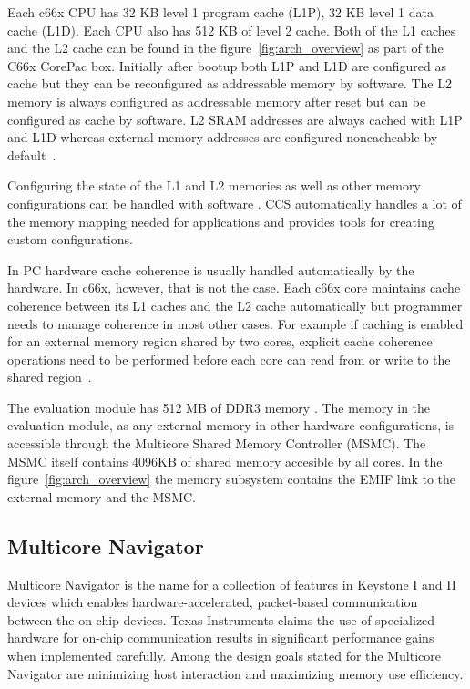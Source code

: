 Each c66x CPU has 32 KB level 1 program cache (L1P), 32 KB level 1 data cache (L1D). Each CPU also has 512 KB of level 2 cache. Both of the L1 caches and the L2 cache can be found in the figure~\ref{fig:arch_overview} as part of the C66x CorePac box. Initially after bootup both L1P and L1D are configured as cache but they can be reconfigured as addressable memory by software. The L2 memory is always configured as addressable memory after reset but can be configured as cache by software. \cite{tmsdatasheet} L2 SRAM addresses are always cached with L1P and L1D whereas external memory addresses are configured noncacheable by default~\cite{cacheguide}.

Configuring the state of the L1 and L2 memories as well as other memory configurations can be handled with software \cite{sprugh7}. CCS automatically handles a lot of the memory mapping needed for applications and provides tools for creating custom configurations.

In PC hardware cache coherence is usually handled automatically by the hardware. In c66x, however, that is not the case. Each c66x core maintains cache coherence between its L1 caches and the L2 cache automatically but programmer needs to manage coherence in most other cases. For example if caching is enabled for an external memory region shared by two cores, explicit cache coherence operations need to be performed before each core can read from or write to the shared region~\cite{cacheguide}.

The evaluation module has 512 MB of DDR3 memory \cite{evmref}. The memory in the evaluation module, as any external memory in other hardware configurations, is accessible through the Multicore Shared Memory Controller (MSMC). The MSMC itself contains 4096KB of shared memory accesible by all cores. In the figure~\ref{fig:arch_overview} the memory subsystem contains the EMIF link to the external memory and the MSMC.

\subsection{Multicore Navigator}
\label{subsec:multicorenav}


Multicore Navigator is the name for a collection of features in Keystone I and II devices which enables hardware-accelerated, packet-based communication between the on-chip devices. Texas Instruments claims the use of specialized hardware for on-chip communication results in significant performance gains when implemented carefully. Among the design goals stated for the Multicore Navigator are minimizing host interaction and maximizing memory use efficiency. \cite{navigator}

